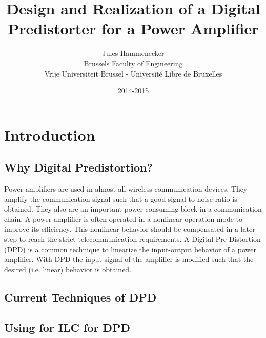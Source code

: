 \documentclass[a4paper]{report}
\begin{document}
\title{Design and Realization of a Digital Predistorter for a Power Amplifier}

\author{Jules Hammenecker \\ Brussels Faculty of Engineering \\ Vrije Universiteit Brussel - Universit\'e Libre de Bruxelles}
\date{2014-2015 }

\maketitle
\begin{abstract}

\end{abstract}

\tableofcontents
\chapter{Introduction}
	\section{Why Digital Predistortion?}
	Power amplifiers are used in almost all wireless communication devices. They amplify the communication signal such that a good signal to noise ratio is obtained. They also are an important power consuming block in a communication chain. A power amplifier is often operated in a nonlinear operation mode to improve its efficiency. This nonlinear behavior should be compensated in a later step to reach the strict telecommunication requirements.
	A Digital Pre-Distortion (DPD) is a common technique to linearize the input-output behavior of a power amplifier. With DPD the input signal of the amplifier is modified such that the desired (i.e. linear) behavior is obtained. 

	\section{Current Techniques of DPD}
	\section{Using for ILC for DPD}
\end{document}
